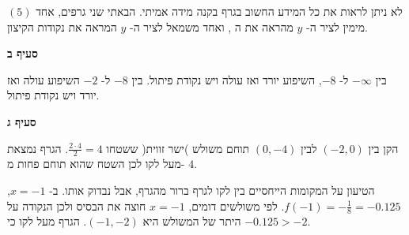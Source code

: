 \np

$(5)$
לא ניתן לראות את כל המידע החשוב בגרף בקנה מידה אמיתי. הבאתי שני גרפים, אחד מימין לציר ה-%
$y$
מהראה את ה%
\asms{},
ואחד משמאל לציר ה-%
$y$
המראה את נקודות הקיצון.

\begin{center}
\end{center}

\begin{center}
\end{center}

\textbf{סעיף ב}

בין 
$-\infty$
ל-%
$-8$,
השיפוע יורד ואז עולה ויש נקודת פיתול. בין
$-8$
ל-%
$-2$
השיפוע עולה ואז יורד ויש נקודת פיתול.

\textbf{סעיף ג}

הקן בין 
$(-2,0)$
לבין
$(0,-4)$
תוחם משולש )ישר זווית( ששטחו
$\frac{2\cdot 4}{2}=4$.
הגרף נמצאת מעל לקו לכן השטח שהוא תוחם פחות מ-%
$4$.

הטיעון על המקומות הייחסיים בין לקו לגרף ברור מהגרף, אבל נבדוק אותו. ב-%
$x=-1$,
$f(-1)=-\frac{1}{8}=-0.125$.
לפי משולשים דומים, 
$x=-1$
חוצה את הבסיס ולכן הנקודה על היתר של המשולש היא
$(-1,-2)$.
הגרף מעל לקו כי
$-0.125>-2$.



\np




